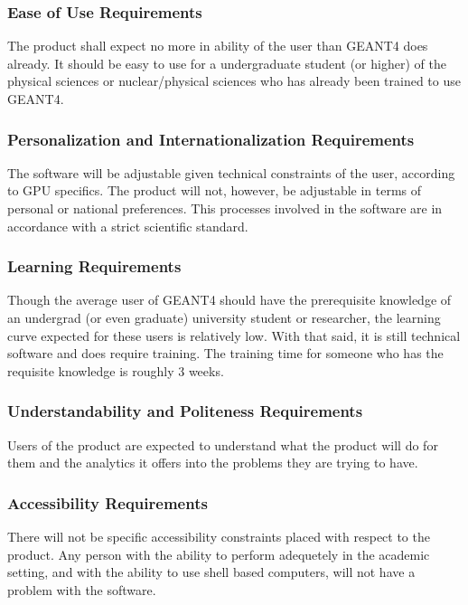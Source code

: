 \documentclass[12pt]{article}
\begin{document}
\subsubsection{Ease of Use Requirements}
The product shall expect no more in ability of the user than GEANT4 does already. It should be easy to use for a 
undergraduate student (or higher) of the physical sciences or nuclear/physical sciences who has already been trained 
to use GEANT4.\\

\subsubsection{Personalization and Internationalization Requirements}
The software will be adjustable given technical constraints of the user, according to GPU specifics. The product will not, however, 
be adjustable in terms of personal or national preferences. This processes involved in the software are in accordance with a strict 
scientific standard. 

\subsubsection{Learning Requirements}
Though the average user of GEANT4 should have the prerequisite knowledge of an undergrad (or even graduate) university student or researcher, the learning curve expected for these users is relatively low. With that said, it is still technical software and does require training. The training time for someone who has the requisite knowledge is roughly 3 weeks.

\subsubsection{Understandability and Politeness Requirements}
Users of the product are expected to understand what the product will do for them and the analytics it offers into the problems they are trying to have.

\subsubsection{Accessibility Requirements}
There will not be specific accessibility constraints placed with respect to the product. Any person with the ability to perform adequetely in the academic setting, and with the ability to use shell based computers, will not have a problem with the software.
\end{document}
